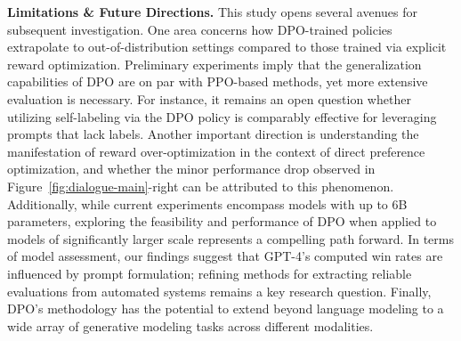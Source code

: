 \textbf{Limitations \& Future Directions.} This study opens several avenues for subsequent investigation. One area concerns how DPO-trained policies extrapolate to out-of-distribution settings compared to those trained via explicit reward optimization. Preliminary experiments imply that the generalization capabilities of DPO are on par with PPO-based methods, yet more extensive evaluation is necessary. For instance, it remains an open question whether utilizing self-labeling via the DPO policy is comparably effective for leveraging prompts that lack labels. Another important direction is understanding the manifestation of reward over-optimization in the context of direct preference optimization, and whether the minor performance drop observed in Figure~\ref{fig:dialogue-main}-right can be attributed to this phenomenon. Additionally, while current experiments encompass models with up to 6B parameters, exploring the feasibility and performance of DPO when applied to models of significantly larger scale represents a compelling path forward. In terms of model assessment, our findings suggest that GPT-4's computed win rates are influenced by prompt formulation; refining methods for extracting reliable evaluations from automated systems remains a key research question. Finally, DPO's methodology has the potential to extend beyond language modeling to a wide array of generative modeling tasks across different modalities.